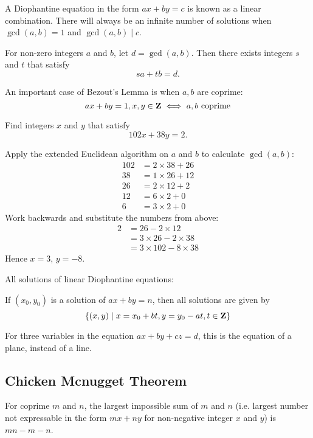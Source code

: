 A Diophantine equation in the form $ax+by=c$ is known as a linear combination. There will always be an infinite number of solutions when $\gcd(a,b)=1$ and $\gcd(a,b)\mid c$.

\begin{theorem}
For non-zero integers $a$ and $b$, let $d=\gcd(a,b)$. Then there exists integers $s$ and $t$ that satisfy
\[sa+tb=d.\] 
\end{theorem}

An important case of Bezout's Lemma is when $a,b$ are coprime:
\[ax+by=1, x,y\in\mathbf Z \iff a,b \text{ coprime}\]

\begin{exercise}
Find integers $x$ and $y$ that satisfy \[102x+38y=2.\] 
\end{exercise}

\begin{solution}
Apply the extended Euclidean algorithm on $a$ and $b$ to calculate $\gcd(a,b)$:
\begin{align*}
102 &= 2 \times 38 + 26\\
38 &= 1 \times 26 + 12\\
26 &= 2 \times 12 + 2\\
12 &= 6 \times 2 + 0\\
6 &= 3 \times 2 + 0
\end{align*}
Work backwards and substitute the numbers from above:
\begin{align*}
2 &= 26 - 2 \times 12\\
&= 3 \times 26 - 2 \times 38\\
&= 3 \times 102 - 8 \times 38
\end{align*}
Hence $x=3$, $y=-8$.
\end{solution}

All solutions of linear Diophantine equations:
\begin{theorem}
If $(x_0,y_0)$ is a solution of $ax + by = n$, then all solutions are given by 
\[\{(x,y)\mid x = x_0 + bt, y = y_0 - at,t \in \mathbf Z\}\]
\end{theorem}

For three variables in the equation $ax + by + cz = d$, this is the equation of a plane, instead of a line.

\subsection{Chicken Mcnugget Theorem}
\begin{theorem}
For coprime $m$ and $n$, the largest impossible sum of $m$ and $n$ (i.e. largest number not expressable in the form $mx+ny$ for non-negative integer $x$ and $y$) is $mn-m-n$.
\end{theorem}

